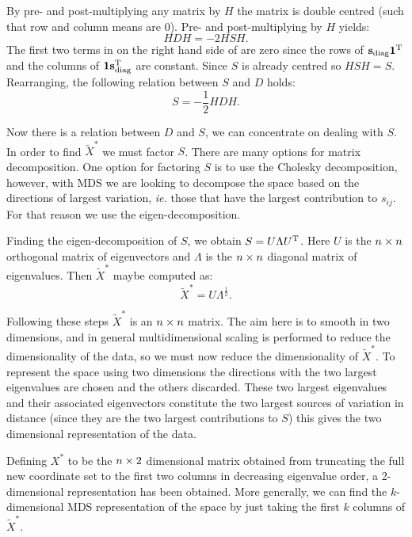 By pre- and post-multiplying any matrix by $H$ the matrix is double centred (such that row and column means are 0). Pre- and post-multiplying  by $H$ yields:
\begin{equation}
HDH = -2HSH.
\end{equation}
The first two terms in on the right hand side of  are zero since the rows of $\mathbf{s}_\text{diag}\mathbf{1}^{\text{T}}$ and the columns of  $\mathbf{1}\mathbf{s}_\text{diag}^{\text{T}}$ are constant. Since $S$ is already centred so $HSH=S$. Rearranging, the following relation between $S$ and $D$ holds:
\begin{equation}
S = -\frac{1}{2}HDH.
\end{equation}

Now there is a relation between $D$ and $S$, we can concentrate on dealing with $S$. In order to find $\tilde{X}^{*}$ we must factor $S$. There are many options for matrix decomposition. One option for factoring $S$ is to use the Cholesky decomposition, however, with MDS we are looking to decompose the space based on the directions of largest variation, \emph{ie.} those that have the largest contribution to $s_{ij}$. For that reason we use the eigen-decomposition.

Finding the eigen-decomposition of $S$, we obtain $S=U\Lambda U^{\text{T}}$. Here $U$ is the $n \times n$ orthogonal matrix of eigenvectors and $\Lambda$ is the $n \times n$ diagonal matrix of eigenvalues. Then $\tilde{X}^*$ maybe computed as:
\begin{equation}
\tilde{X}^*=U\Lambda^{\frac{1}{2}}.
\end{equation}

Following these steps $\tilde{X}^*$ is an $n \times n$ matrix. The aim here is to smooth in two dimensions, and in general multidimensional scaling is performed to reduce the dimensionality of the data, so we must now reduce the dimensionality of $\tilde{X}^*$. To represent the space using two dimensions the directions with the two largest eigenvalues are chosen and the others discarded. These two largest eigenvalues and their associated eigenvectors constitute the two largest sources of variation in distance (since they are the two largest contributions to $S$) this gives the two dimensional representation of the data. 

Defining $X^*$ to be the $n \times 2$ dimensional matrix obtained from truncating the full new coordinate set to the first two columns in decreasing eigenvalue order, a 2-dimensional representation has been obtained. More generally, we can find the $k$-dimensional MDS representation of the space by just taking the first $k$ columns of $\tilde{X}^*$.

